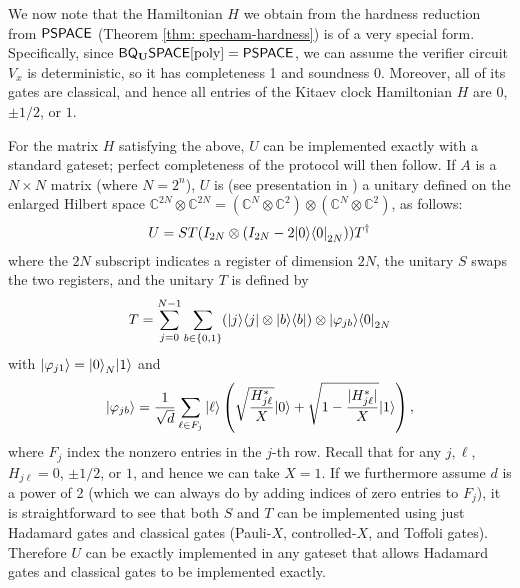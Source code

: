 \documentclass[11pt]{article}
\theoremstyle{definition}
\theoremstyle{remark}
\theoremstyle{definition}
\newcommand\PSPACE{{\sf{PSPACE}}}
\newcommand{\classfont}{\sf}
\newcommand{\Unitary}{\mathbf{U}}
\newcommand{\unitaryBQSPACE}[1]{{\classfont{BQ}_\Unitary\classfont{SPACE}}[#1]}
\newcommand{\poly}{\textrm{poly}}
\begin{document}
We now note that the Hamiltonian $H$ we obtain from the hardness reduction from $\PSPACE$ (Theorem \ref{thm: specham-hardness}) is of a very special form. Specifically, since $\unitaryBQSPACE{\poly}=\PSPACE$, we can assume the verifier circuit $V_x$ is deterministic, so it has completeness 1 and soundness 0. Moreover, all of its gates are classical, and hence all entries of the Kitaev clock Hamiltonian $H$ are $0$, $\pm 1/2$, or $1$.

For the matrix $H$ satisfying the above, $U$ can be implemented exactly with a standard gateset; perfect completeness of the protocol will then follow. If $A$ is a $N \times N$ matrix (where $N=2^n$), $U$ is (see presentation in \cite[Section~3.1~and~Lemma~10]{berry15}) a unitary defined on the enlarged Hilbert space $\mathbb{C}^{2N} \otimes \mathbb{C}^{2N} = (\mathbb{C}^{N} \otimes \mathbb{C}^2) \otimes  (\mathbb{C}^{N} \otimes \mathbb{C}^2)$, as follows:
\begin{equation}
U = ST(I_{2N} \otimes (I_{2N} - 2{\left\vert{0}\right\rangle}{\left\langle{0}\right\vert}_{2N})) T^\dagger
\end{equation}
where the $2N$ subscript indicates a register of dimension $2N$, the unitary $S$ swaps the two registers, and the unitary $T$ is defined by
\begin{equation}
T = \sum_{j=0}^{N-1}\sum_{b \in \{0,1\}} ({\left\vert{j}\right\rangle}{\left\langle{j}\right\vert} \otimes {\left\vert{b}\right\rangle}{\left\langle{b}\right\vert}) \otimes {\left\vert{\varphi_{jb}}\right\rangle}{\left\langle{0}\right\vert}_{2N}
\end{equation}
with ${\left\vert{\varphi_{j1}}\right\rangle} = {\left\vert{0}\right\rangle}_N{\left\vert{1}\right\rangle}$ and
\begin{equation}
{\left\vert{\varphi_{jb}}\right\rangle} = \frac{1}{\sqrt{d}} \sum_{\ell \in F_j} {\left\vert{\ell}\right\rangle}\left(\sqrt{\frac{H^*_{j\ell}}{X}}{\left\vert{0}\right\rangle} + \sqrt{1-\frac{|H^*_{j\ell}|}{X}}{\left\vert{1}\right\rangle}\right),
\end{equation}
where $F_j$ index the nonzero entries in the $j$-th row. Recall that for any $j,\ell$, $H_{j\ell}=0$, $\pm 1/2$, or $1$, and hence we can take $X=1$. If we furthermore assume $d$ is a power of 2 (which we can always do by adding indices of zero entries to $F_j$), it is straightforward to see that both $S$ and $T$ can be implemented using just Hadamard gates and classical gates (Pauli-$X$, controlled-$X$, and Toffoli gates). Therefore $U$ can be exactly implemented in any gateset that allows Hadamard gates and classical gates to be implemented exactly.
\end{document}
